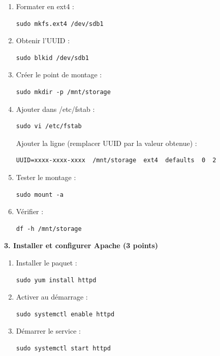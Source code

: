 \documentclass[12pt,a4paper]{article}
\begin{document}
\begin{answerbox}
\begin{enumerate}
    \item Formater en ext4 :
    \begin{lstlisting}
sudo mkfs.ext4 /dev/sdb1
    \end{lstlisting}
    
    \item Obtenir l'UUID :
    \begin{lstlisting}
sudo blkid /dev/sdb1
    \end{lstlisting}
    
    \item Créer le point de montage :
    \begin{lstlisting}
sudo mkdir -p /mnt/storage
    \end{lstlisting}
    
    \item Ajouter dans /etc/fstab :
    \begin{lstlisting}
sudo vi /etc/fstab
    \end{lstlisting}
    
    Ajouter la ligne (remplacer UUID par la valeur obtenue) :
    \begin{verbatim}
UUID=xxxx-xxxx-xxxx  /mnt/storage  ext4  defaults  0  2
    \end{verbatim}
    
    \item Tester le montage :
    \begin{lstlisting}
sudo mount -a
    \end{lstlisting}
    
    \item Vérifier :
    \begin{lstlisting}
df -h /mnt/storage
    \end{lstlisting}
\end{enumerate}

\textbf{3. Installer et configurer Apache (3 points)}

\begin{enumerate}
    \item Installer le paquet :
    \begin{lstlisting}
sudo yum install httpd
    \end{lstlisting}
    
    \item Activer au démarrage :
    \begin{lstlisting}
sudo systemctl enable httpd
    \end{lstlisting}
    
    \item Démarrer le service :
    \begin{lstlisting}
sudo systemctl start httpd
    \end{lstlisting}
    

\end{enumerate}
\end{answerbox}
\end{document}
